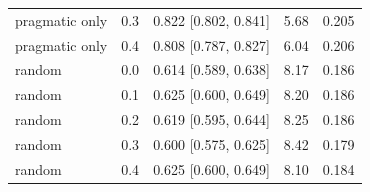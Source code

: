 \begin{table}[t]
\begin{tabular}{llp{2.6cm}rr}
pragmatic only & 0.3 & 0.822 [0.802, 0.841] & 5.68 & 0.205 \\
pragmatic only & 0.4 & 0.808 [0.787, 0.827] & 6.04 & 0.206 \\
random & 0.0 & 0.614 [0.589, 0.638] & 8.17 & 0.186 \\
random & 0.1 & 0.625 [0.600, 0.649] & 8.20 & 0.186 \\
random & 0.2 & 0.619 [0.595, 0.644] & 8.25 & 0.186 \\
random & 0.3 & 0.600 [0.575, 0.625] & 8.42 & 0.179 \\
random & 0.4 & 0.625 [0.600, 0.649] & 8.10 & 0.184 \\
\bottomrule
\end{tabular}
\end{table}
